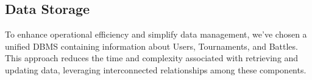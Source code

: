\subsection{Data Storage} 
To enhance operational efficiency and simplify data management, we've chosen a unified DBMS containing information about Users, Tournaments, and Battles. This approach reduces the time and complexity associated with retrieving and updating data, leveraging interconnected relationships among these components.